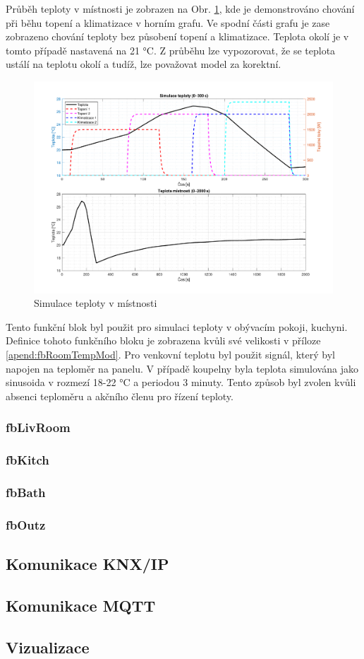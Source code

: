 \noindent Průběh teploty v místnosti je zobrazen na Obr. \ref{fig:simulace_teplota}, kde je demonstrováno chování při běhu topení a klimatizace v horním grafu. Ve spodní části grafu je zase zobrazeno chování teploty bez působení topení a klimatizace. Teplota okolí je v tomto případě nastavená na 21 °C. Z průběhu lze vypozorovat, že se teplota ustálí na teplotu okolí a tudíž, lze považovat model za korektní.
\newpage
\begin{figure}[!ht]
    \begin{center}
        \includegraphics[scale=0.52]{obrazky/simulace_teploty_kuchyne.pdf}
    \end{center}
    \caption[Simulace teploty v místnosti]{Simulace teploty v místnosti}
    \label{fig:simulace_teplota}
\end{figure}

\noindent Tento funkční blok byl použit pro simulaci teploty v obývacím pokoji, kuchyni. Definice tohoto funkčního bloku je zobrazena kvůli své velikosti v příloze \ref{apend:fbRoomTempMod}. Pro venkovní teplotu byl použit signál, který byl napojen na teploměr na panelu. V případě koupelny byla teplota simulována jako sinusoida v rozmezí 18-22 °C a periodou 3 minuty. Tento způsob byl zvolen kvůli absenci teploměru a akčního členu pro řízení teploty. 

\subsubsection{fbLivRoom}
\subsubsection{fbKitch}
\subsubsection{fbBath}
\subsubsection{fbOutz}

\subsection{Komunikace KNX/IP}
\subsection{Komunikace MQTT}
\subsection{Vizualizace}
